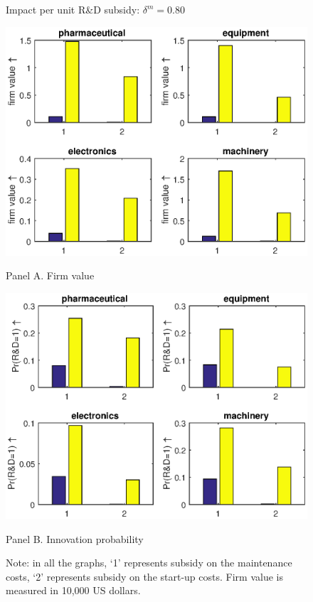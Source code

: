 \documentclass[11pt]{article}
\begin{document}
\begin{figure}[h]
    \caption{Impact per unit R\&D subsidy: $\delta^m=0.80$}
    \label{F7}
    \centering
    \begin{minipage}{0.48\textwidth}
      \includegraphics[width=\textwidth]{Figs/valuechangePerUnit.eps}  
      \caption*{Panel A. Firm value}      
    \end{minipage}
    \hfill
    \begin{minipage}{0.48\textwidth}
        \includegraphics[width=\textwidth]{Figs/probchangePerUnit.eps}
        \caption*{Panel B. Innovation probability}
    \end{minipage}
    \caption*{\small{}Note: in all the graphs, `1' represents subsidy on the maintenance costs, `2' represents subsidy on the start-up costs. Firm value is measured in 10,000 US dollars.}{\small \par}
\end{figure}
\end{document}
